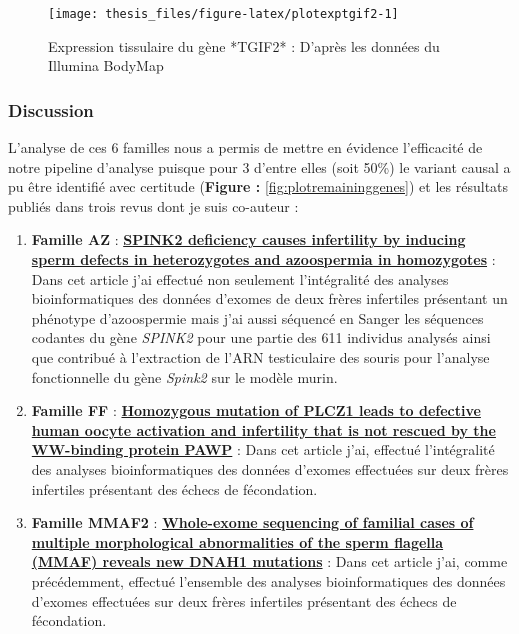 \documentclass[12pt,twoside]{reedthesis}
\providecommand{\tightlist}{%
  \setlength{\itemsep}{0pt}\setlength{\parskip}{0pt}}
\theoremstyle{definition}
\theoremstyle{definition}
\theoremstyle{remark}
\begin{document}
  \newpage 
  
  \begin{figure}
  
  {\centering \texttt{[image: thesis\_files/figure-latex/plotexptgif2-1]} 
  
  }
  
  \caption[Expression tissulaire du gène *TGIF2*]{Expression tissulaire du gène *TGIF2* : D'après les données du Illumina BodyMap}\label{fig:plotexptgif2}
  \end{figure}
  
  \newpage
  
  \subsubsection{Discussion}\label{discussion}
  
  L'analyse de ces 6 familles nous a permis de mettre en évidence
  l'efficacité de notre pipeline d'analyse puisque pour 3 d'entre elles
  (soit 50\%) le variant causal a pu être identifié avec certitude
  (\textbf{Figure : }\ref{fig:plotremaininggenes}) et les résultats
  publiés dans trois revus dont je suis co-auteur :
  
  \begin{enumerate}
  \def\labelenumi{\arabic{enumi}.}
  \tightlist
  \item
    \textbf{Famille AZ} : \protect\hyperlink{spink2}{\textbf{SPINK2
    deficiency causes infertility by inducing sperm defects in
    heterozygotes and azoospermia in homozygotes}} : Dans cet article j'ai
    effectué non seulement l'intégralité des analyses bioinformatiques des
    données d'exomes de deux frères infertiles présentant un phénotype
    d'azoospermie mais j'ai aussi séquencé en Sanger les séquences
    codantes du gène \emph{SPINK2} pour une partie des 611 individus
    analysés ainsi que contribué à l'extraction de l'ARN testiculaire des
    souris pour l'analyse fonctionnelle du gène \emph{Spink2} sur le
    modèle murin.\\
  \item
    \textbf{Famille FF} : \protect\hyperlink{plcz}{\textbf{Homozygous
    mutation of PLCZ1 leads to defective human oocyte activation and
    infertility that is not rescued by the WW-binding protein PAWP}} :
    Dans cet article j'ai, effectué l'intégralité des analyses
    bioinformatiques des données d'exomes effectuées sur deux frères
    infertiles présentant des échecs de fécondation.\\
  \item
    \textbf{Famille MMAF2} :
    \protect\hyperlink{famdnah1}{\textbf{Whole-exome sequencing of
    familial cases of multiple morphological abnormalities of the sperm
    flagella (MMAF) reveals new DNAH1 mutations}} : Dans cet article j'ai,
    comme précédemment, effectué l'ensemble des analyses bioinformatiques
    des données d'exomes effectuées sur deux frères infertiles présentant
    des échecs de fécondation.
  \end{enumerate}
  
\end{document}

